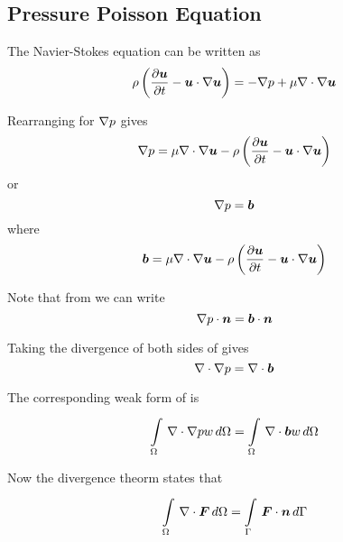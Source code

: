 \subsection{Pressure Poisson Equation}

The Navier-Stokes equation can be written as
\begin{equation}
  \rho\pbrac{\delby{\vect{u}}{t}-\dotprod{\vect{u}}{\gradient{\vect{u}}}}=-\grad{p}+\mu\diverg{\gradient{\vect{u}}}
  \label{eqn:NavierStokes}
\end{equation}

Rearranging for $\nabla{p}$ gives
\begin{equation}
  \grad{p}=\mu\diverg{\gradient{\vect{u}}}-\rho\pbrac{\delby{\vect{u}}{t}-\dotprod{\vect{u}}{\gradient{\vect{u}}}}  
\end{equation}
or
\begin{equation}
  \gradient{p}=\vect{b}
  \label{eqn:NavierStokesPressureForm}
\end{equation}
where
\begin{equation}
  \vect{b}=\mu\diverg{\gradient{\vect{u}}}-\rho\pbrac{\delby{\vect{u}}{t}-\dotprod{\vect{u}}{\gradient{\vect{u}}}}
\end{equation}

Note that from  we can write
\begin{equation} 
  \dotprod{\gradient{p}}{\normal}=\dotprod{\vect{b}}{\normal}
  \label{eqn:NavierStokesPressureFormNormal}
\end{equation}

Taking the divergence of both sides of  gives
\begin{equation}
  \diverg{\gradient{p}}=\diverg{\vect{b}}
  \label{eqn:PressurePoisson}
\end{equation}

The corresponding weak form of  is
\begin{equation}
  \gint{\Omega}{}{\diverg{\gradient{p}}w}{\Omega}=\gint{\Omega}{}{\diverg{\vect{b}}w}{\Omega}
  \label{eqn:PressurePoissonWeakForm}
\end{equation}

Now the divergence theorm states that
\begin{equation}
  \gint{\Omega}{}{\diverg{\tensor{F}}}{\Omega}=\gint{\Gamma}{}{\dotprod{\tensor{F}}{\normal}}{\Gamma}
  \label{eqn:DivergenceTheorm}
\end{equation}

